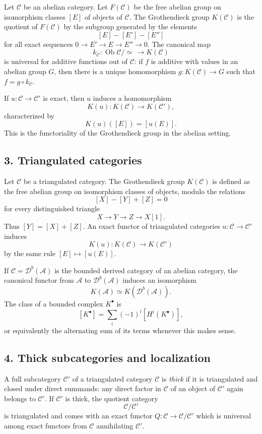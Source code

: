 \documentclass[11pt]{article}
\theoremstyle{plain}
\theoremstyle{definition}
\theoremstyle{remark}
\newcommand{\cA}{\mathcal A}\newcommand{\cB}{\mathcal B}\newcommand{\cC}{\mathcal C}
\newcommand{\D}{\mathcal D}\newcommand{\E}{\mathcal E}\newcommand{\F}{\mathcal F}
\begin{document}
Let $\cC$ be an abelian category. Let $F(\cC)$ be the free abelian group on isomorphism classes $[E]$ of objects of $\cC$. The Grothendieck group $K(\cC)$ is the quotient of $F(\cC)$ by the subgroup generated by the elements
\[
   [E]-[E']-[E'']
\]
for all exact sequences $0\to E'\to E\to E''\to0$. The canonical map
\[
   k_\cC:\operatorname{Ob}\cC/\simeq\,\longrightarrow K(\cC)
\]
is universal for additive functions out of $\cC$: if $f$ is additive with values in an abelian group $G$, then there is a unique homomorphism $g:K(\cC)\to G$ such that $f=g\circ k_\cC$.

If $u:\cC\to\cC'$ is exact, then $u$ induces a homomorphism
\[
   K(u):K(\cC)\to K(\cC'),
\]
characterized by
\[
   K(u)([E])=[u(E)].
\]
This is the functoriality of the Grothendieck group in the abelian setting.

\subsection*{3. Triangulated categories}

Let $\cC$ be a triangulated category. The Grothendieck group $K(\cC)$ is defined as the free abelian group on isomorphism classes of objects, modulo the relations
\[
   [X]-[Y]+[Z]=0
\]
for every distinguished triangle
\[
   X\to Y\to Z\to X[1].
\]
Thus $[Y]=[X]+[Z]$. An exact functor of triangulated categories $u:\cC\to\cC'$ induces
\[
   K(u):K(\cC)\to K(\cC')
\]
by the same rule $[E]\mapsto [u(E)]$.

If $\cC=\D^b(\cA)$ is the bounded derived category of an abelian category, the canonical functor from $\cA$ to $\D^b(\cA)$ induces an isomorphism
\[
   K(\cA)\simeq K(\D^b(\cA)).
\]
The class of a bounded complex $K^\bullet$ is
\[
   [K^\bullet]=\sum_i(-1)^i[H^i(K^\bullet)],
\]
or equivalently the alternating sum of its terms whenever this makes sense.

\subsection*{4. Thick subcategories and localization}

A full subcategory $\cC'$ of a triangulated category $\cC$ is \emph{thick} if it is triangulated and closed under direct summands: any direct factor in $\cC$ of an object of $\cC'$ again belongs to $\cC'$. If $\cC'$ is thick, the quotient category
\[
   \cC/\cC'
\]
is triangulated and comes with an exact functor $Q:\cC\to\cC/\cC'$ which is universal among exact functors from $\cC$ annihilating $\cC'$.
\end{document}
